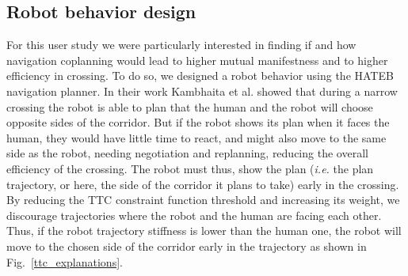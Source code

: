 \documentclass[a4paper,11pt,twoside]{StyleThese}
\begin{document}
\subsection{Robot behavior design}
For this user study we were particularly interested in finding if and how navigation coplanning would lead to higher mutual manifestness and to higher efficiency in crossing.
To do so, we designed a robot behavior using the HATEB navigation planner.
In their work Kambhaita et al. showed that during a narrow crossing the robot is able to plan that the human and the robot will choose opposite sides of the corridor. But if the robot shows its plan when it faces the human, they would have little time to react, and might also move to the same side as the robot, needing negotiation and replanning, reducing the overall efficiency of the crossing. The robot must thus, show the plan (\textit{i.e.} the plan trajectory, or here, the side of the corridor it plans to take) early in the crossing.
By reducing the TTC constraint function threshold and increasing its weight, we discourage trajectories where the robot and the human are facing each other. Thus, if the robot trajectory stiffness is lower than the human one, the robot will move to the chosen side of the corridor early in the trajectory as shown in Fig.~\ref{ttc_explanations}.
\end{document}
